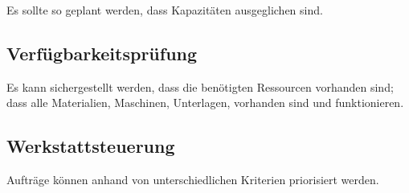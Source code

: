 \documentclass{article}
\begin{document}
Es sollte so geplant werden, dass Kapazitäten ausgeglichen sind.

\subsection{Verfügbarkeitsprüfung}
Es kann sichergestellt werden, dass die benötigten Ressourcen vorhanden sind; dass alle Materialien, Maschinen, Unterlagen, \etc vorhanden sind und funktionieren.

\subsection{Werkstattsteuerung}
Aufträge können anhand von unterschiedlichen Kriterien priorisiert werden.
\end{document}
